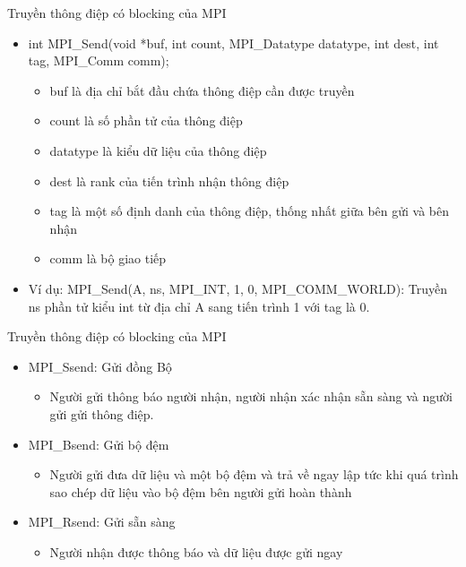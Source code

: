 \documentclass[10pt]{beamer}
\theoremstyle{remark}
\numberwithin{algocf}{section}
\numberwithin{equation}{section}
\numberwithin{dl}{section}
\numberwithin{figure}{section}
\begin{document}
\begin{frame}{Truyền thông điệp có blocking của MPI}
    \begin{itemize}
        \item int MPI\_Send(void *buf, int count, MPI\_Datatype datatype,
                            int dest, int tag, MPI\_Comm comm);
        \begin{itemize}
            \item buf là địa chỉ bắt đầu chứa thông điệp cần được truyền
            \item count là số phần tử của thông điệp
            \item datatype là kiểu dữ liệu của thông điệp
            \item dest là rank của tiến trình nhận thông điệp
            \item tag là một số định danh của thông điệp, thống nhất giữa bên gửi và bên nhận
            \item comm là bộ giao tiếp
        \end{itemize}
        \item Ví dụ: MPI\_Send(A, ns, MPI\_INT, 1, 0, MPI\_COMM\_WORLD): 
        Truyền ns phần tử kiểu int từ địa chỉ A sang tiến trình 1 với tag là 0.
    \end{itemize}
\end{frame}

\begin{frame}{Truyền thông điệp có blocking của MPI}
    \begin{itemize}
        \item MPI\_Ssend: Gửi đồng Bộ
        \begin{itemize}
            \item Người gửi thông báo người nhận, người nhận xác nhận sẵn sàng và người gửi gửi thông điệp.
        \end{itemize}
        \item MPI\_Bsend: Gửi bộ đệm
        \begin{itemize}
            \item Người gửi đưa dữ liệu và một bộ đệm và trả về ngay lập tức khi quá trình sao chép dữ liệu vào bộ đệm bên người gửi hoàn thành
        \end{itemize}
        \item MPI\_Rsend: Gửi sẵn sàng
        \begin{itemize}
            \item Người nhận được thông báo và dữ liệu được gửi ngay
        \end{itemize}
    \end{itemize}
\end{frame}
\end{document}
